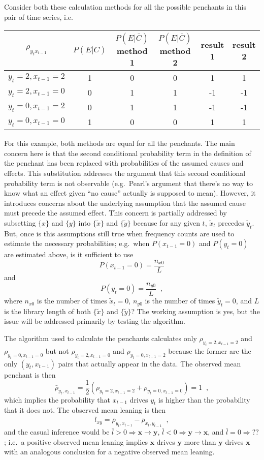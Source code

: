 \documentclass[a4paper,11pt]{article}
\begin{document}
Consider both these calculation methods for all the possible penchants in this pair of time series, i.e.\
\begin{center}
\begin{tabular}{c|c|c|c|c|c}
$\rho_{y_{t}x_{t-1}}$ & $P(E|C)$ & $P(E|\bar{C})$ method 1 & $P(E|\bar{C})$ method 2 & result 1 & result 2\\
\hline
 $y_{t}=2,x_{t-1}=2$& 1 & 0 & 0 & 1 & 1\\
 $y_{t}=2,x_{t-1}=0$& 0 & 1 & 1 & -1 & -1\\
 $y_{t}=0,x_{t-1}=2$& 0 & 1 & 1 & -1 & -1\\
 $y_{t}=0,x_{t-1}=0$& 1 & 0 & 0 & 1 & 1
\end{tabular}
\end{center}
For this example, both methods are equal for all the penchants.  The main concern here is that the second conditional probability term in the definition of the penchant has been replaced with probabilities of the assumed causes and effects.  This substitution addresses the argument that this second conditional probability term is not observable (e.g.\ Pearl's argument that there's no way to know what an effect given ``no cause'' actually is supposed to mean).  However, it introduces concerns about the underlying assumption that the assumed cause must precede the assumed effect.  This concern is partially addressed by subsetting $\{x\}$ and $\{y\}$ into $\{\tilde{x}\}$ and $\{\tilde{y}\}$ because for any given $t$, $\tilde{x}_t$ precedes $\tilde{y}_t$.  But, once is this assumptions still true when frequency counts are used to estimate the necessary probabilities; e.g.\ when $P(x_{t-1}=0)$ and $P(y_t=0)$ are estimated above, is it sufficient to use   
$$
P(x_{t-1}=0) = \frac{n_{x0}}{L}
$$ 
and 
$$
P(y_t=0) = \frac{n_{y0}}{L}\;\;,
$$
where $n_{x0}$ is the number of times $\tilde{x}_t = 0$, $n_{y0}$ is the number of times $\tilde{y}_t = 0$, and $L$ is the library length of both $\{\tilde{x}\}$ and $\{\tilde{y}\}$?  The working assumption is yes, but the issue will be addressed primarily by testing the algorithm.

The algorithm used to calculate the penchants calculates only $\rho_{y_{t}=2,x_{t-1}=2}$ and $\rho_{y_{t}=0,x_{t-1}=0}$ but not $\rho_{y_{t}=2,x_{t-1}=0}$ and $\rho_{y_{t}=0,x_{t-1}=2}$ because the former are the only $(y_{t},x_{t-1})$ pairs that actually appear in the data.  The observed mean penchant is then 
$$
\bar{\rho}_{y_{t},x_{t-1}} = \frac{1}{2}\left( \rho_{y_{t}=2,x_{t-1}=2} + \rho_{y_{t}=0,x_{t-1}=0} \right) = 1\;\;,
$$
which implies the probability that $x_{t-1}$ drives $y_{t}$ is higher than the probability that it does not.  The observed mean leaning is then
$$
\bar{l}_{xy} = \bar{\rho}_{y_{t},x_{t-1}} - \bar{\rho}_{x_{t},y_{t-1}}\;\;,
$$
and the casual inference would be $\bar{l}>0\Rightarrow \mathbf{x}\rightarrow\mathbf{y}$, $\bar{l}<0\Rightarrow \mathbf{y}\rightarrow\mathbf{x}$, and $\bar{l}=0\Rightarrow ??$; i.e.\ a positive observed mean leaning implies $\mathbf{x}$ drives $\mathbf{y}$ more than $\mathbf{y}$ drives $\mathbf{x}$ with an analogous conclusion for a negative observed mean leaning.   
\end{document}
